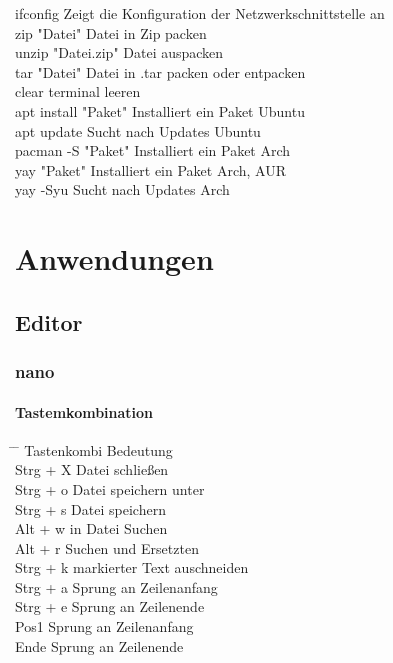 \documentclass[10pt,a4paper,twoside]{book}
\begin{document}
\begin{tabbing}
\> ifconfig \> Zeigt die Konfiguration der Netzwerkschnittstelle an\\
\> zip "Datei" \> Datei in Zip packen\\
\> unzip "Datei.zip" \> Datei auspacken\\
\> tar "Datei" \> Datei in .tar packen oder entpacken\\
\> clear \> terminal leeren\\
\> apt install "Paket" \> Installiert ein Paket Ubuntu\\
\> apt update \> Sucht nach Updates Ubuntu\\
\> pacman -S "Paket" \> Installiert ein Paket Arch\\
\> yay "Paket" \> Installiert ein Paket Arch, AUR \\
\> yay -Syu \> Sucht nach Updates Arch \\
\end{tabbing}
\section{Anwendungen}
\subsection{Editor}
\subsubsection{nano}
\paragraph{Tastemkombination}
\begin{tabbing}
\hspace*{1mm} \=\hspace*{30mm} \= \kill
\> Tastenkombi \> Bedeutung  \\
\> Strg + X \> Datei schließen\\
\> Strg + o \> Datei speichern unter \\
\> Strg + s \> Datei speichern\\
\> Alt + w \> in Datei Suchen\\
\> Alt + r \> Suchen und Ersetzten\\
\> Strg + k \> markierter Text auschneiden\\
\> Strg + a \> Sprung an Zeilenanfang\\
\> Strg + e \> Sprung an Zeilenende\\
\> Pos1 \> Sprung an Zeilenanfang\\
\> Ende \> Sprung an Zeilenende\\
\end{tabbing}
\end{document}
